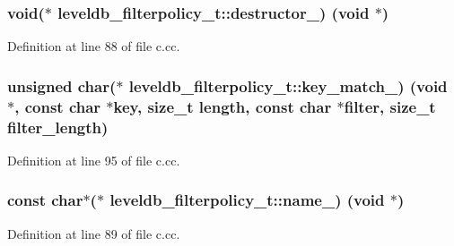 \hypertarget{structleveldb__filterpolicy__t_ac743c53a14a4061cf30832a1861573ed}{}
\subsubsection[{destructor\+\_\+}]{\setlength{\rightskip}{0pt plus 5cm}void($\ast$ leveldb\+\_\+filterpolicy\+\_\+t\+::destructor\+\_\+) (void $\ast$)}\label{structleveldb__filterpolicy__t_ac743c53a14a4061cf30832a1861573ed}


Definition at line 88 of file c.\+cc.

\hypertarget{structleveldb__filterpolicy__t_a453f04cb3420879256c6194b5de0a818}{}
\subsubsection[{key\+\_\+match\+\_\+}]{\setlength{\rightskip}{0pt plus 5cm}unsigned char($\ast$ leveldb\+\_\+filterpolicy\+\_\+t\+::key\+\_\+match\+\_\+) (void $\ast$, const char $\ast$key, size\+\_\+t length, const char $\ast$filter, size\+\_\+t filter\+\_\+length)}\label{structleveldb__filterpolicy__t_a453f04cb3420879256c6194b5de0a818}


Definition at line 95 of file c.\+cc.

\hypertarget{structleveldb__filterpolicy__t_a5fbc18ad0916314ffafe205543bad720}{}
\subsubsection[{name\+\_\+}]{\setlength{\rightskip}{0pt plus 5cm}const char$\ast$($\ast$ leveldb\+\_\+filterpolicy\+\_\+t\+::name\+\_\+) (void $\ast$)}\label{structleveldb__filterpolicy__t_a5fbc18ad0916314ffafe205543bad720}


Definition at line 89 of file c.\+cc.

\hypertarget{structleveldb__filterpolicy__t_a35aa5dd2f350f6eafa4ae904e55dcbe2}{}
